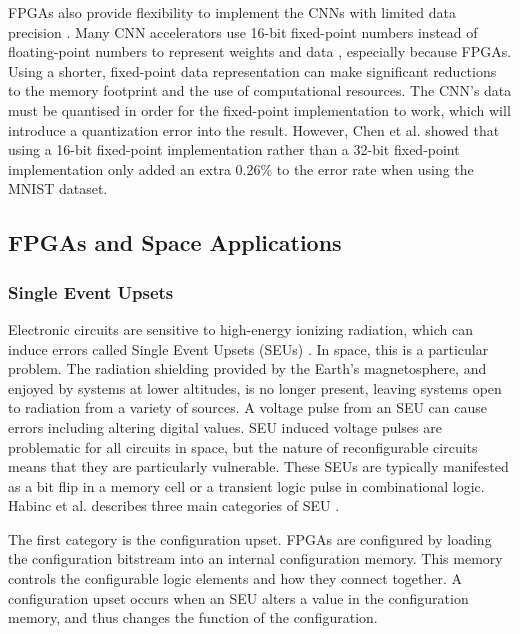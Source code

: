 \documentclass[12pt]{article}
\begin{document}
FPGAs also provide flexibility to implement the CNNs with limited data precision \cite{SudaFpgaAccelerator}. Many CNN accelerators use 16-bit fixed-point numbers instead of floating-point numbers to represent weights and data \cite{ZhangFpgaAccelerator}\cite{ChenFpgaAccelerator}\cite{FarabetFpgaAccelerator}, especially because FPGAs. Using a shorter, fixed-point data representation can make significant reductions to the memory footprint and the use of computational resources. The CNN's data must be quantised in order for the fixed-point implementation to work, which will introduce a quantization error into the result. However, Chen et al. showed that using a 16-bit fixed-point implementation rather than a 32-bit fixed-point implementation only added an extra 0.26\% to the error rate when using the MNIST dataset.

\subsection{FPGAs and Space Applications}
\label{sec:Background-FPGAsAndSpaceApplications}


\subsubsection{Single Event Upsets}
\label{sec:Background-FPGAsAndSpaceApplications-SEUs}


Electronic circuits are sensitive to high-energy ionizing radiation, which can induce errors called Single Event Upsets (SEUs) \cite{SeuTutorial}. In space, this is a particular problem. The radiation shielding provided by the Earth's magnetosphere, and enjoyed by systems at lower altitudes, is no longer present, leaving systems open to radiation from a  variety of sources. A voltage pulse from an SEU can cause errors including altering digital values. SEU induced voltage pulses are problematic for all circuits in space, but the nature of reconfigurable circuits means that they are particularly vulnerable. These SEUs are typically manifested as a bit flip in a memory cell or a transient logic pulse in combinational logic. Habinc et al. describes three main categories of SEU \cite{SuitabilityGaisler}.

The first category is the configuration upset. FPGAs are configured by loading the configuration bitstream into an internal configuration memory. This memory controls the configurable logic elements and how they connect together. A configuration upset occurs when an SEU alters a value in the configuration memory, and thus changes the function of the configuration. 
\end{document}
